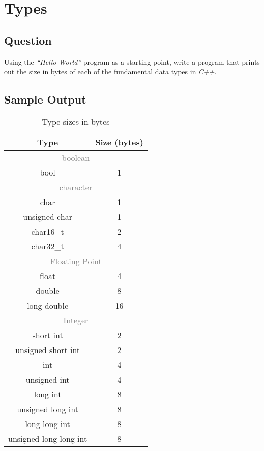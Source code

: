 \section{Types}
    \subsection*{Question}
        Using the \textit{“Hello World”} program as a starting point, 
        write a program that prints out the size in bytes of each of the fundamental data types in \textit{C++}.
        
    \subsection*{Sample Output}
        \begin{table}[H]
            \centering
            \begin{tabular}{c c}
                \hline
                \textbf{Type} & \textbf{Size (bytes)} \\
                \hline
                \multicolumn{2}{c}{\textcolor{gray}{boolean}} \\
                bool & 1 \\
                \multicolumn{2}{c}{\textcolor{gray}{character}} \\
                char & 1 \\
                unsigned char & 1 \\
                char16\_t & 2 \\
                char32\_t & 4 \\
                \multicolumn{2}{c}{\textcolor{gray}{Floating Point}} \\
                float & 4 \\
                double & 8 \\
                long double & 16 \\
                \multicolumn{2}{c}{\textcolor{gray}{Integer}} \\
                short int & 2 \\
                unsigned short int & 2 \\
                int & 4 \\
                unsigned int & 4 \\
                long int & 8 \\
                unsigned long int & 8 \\
                long long int & 8 \\
                unsigned long long int & 8 \\
                \hline
            \end{tabular}
            \caption{Type sizes in bytes}
        \end{table}

